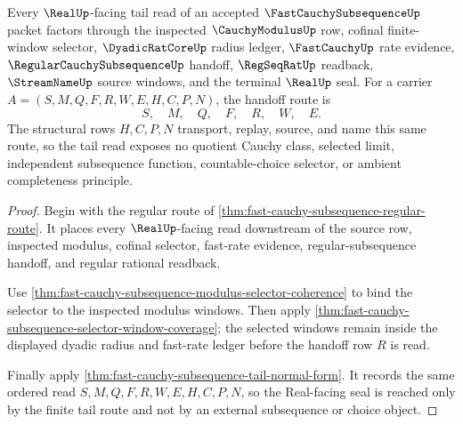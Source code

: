 \begin{theorem}
\label{thm:fast-cauchy-subsequence-realup-tail-handoff}
Every $\RealUp$-facing tail read of an accepted $\FastCauchySubsequenceUp$ packet factors through the inspected $\CauchyModulusUp$ row, cofinal finite-window selector, $\DyadicRatCoreUp$ radius ledger, $\FastCauchyUp$ rate evidence, $\RegularCauchySubsequenceUp$ handoff, $\RegSeqRatUp$ readback, $\StreamNameUp$ source windows, and the terminal $\RealUp$ seal. For a carrier $A=(S,M,Q,F,R,W,E,H,C,P,N)$, the handoff route is
$$
S,\quad M,\quad Q,\quad F,\quad R,\quad W,\quad E .
$$
The structural rows $H,C,P,N$ transport, replay, source, and name this same route, so the tail read exposes no quotient Cauchy class, selected limit, independent subsequence function, countable-choice selector, or ambient completeness principle.
\end{theorem}
\begin{proof}
Begin with the regular route of \autoref{thm:fast-cauchy-subsequence-regular-route}. It places every $\RealUp$-facing read downstream of the source row, inspected modulus, cofinal selector, fast-rate evidence, regular-subsequence handoff, and regular rational readback.

Use \autoref{thm:fast-cauchy-subsequence-modulus-selector-coherence} to bind the selector to the inspected modulus windows. Then apply \autoref{thm:fast-cauchy-subsequence-selector-window-coverage}; the selected windows remain inside the displayed dyadic radius and fast-rate ledger before the handoff row $R$ is read.

Finally apply \autoref{thm:fast-cauchy-subsequence-tail-normal-form}. It records the same ordered read $S,M,Q,F,R,W,E,H,C,P,N$, so the Real-facing seal is reached only by the finite tail route and not by an external subsequence or choice object.
\end{proof}

